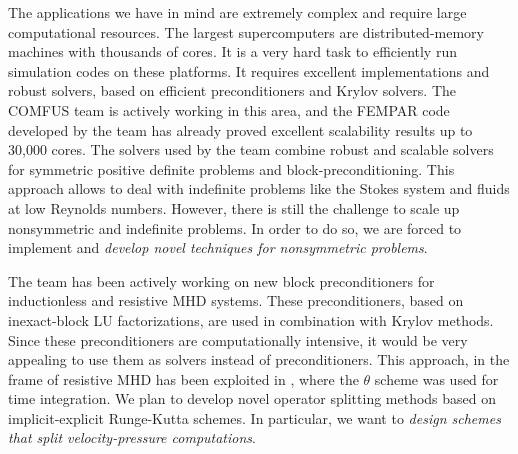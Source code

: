 The applications we have in mind are extremely complex and require large computational resources. The largest supercomputers are distributed-memory machines with thousands of cores. It is a very hard task to efficiently run simulation codes on these platforms. It requires excellent implementations and robust solvers, based on efficient preconditioners and Krylov solvers. The COMFUS team is actively working in this area, and the FEMPAR code developed by the team has already proved excellent scalability results up to 30,000 cores. The solvers used by the team combine robust and scalable solvers for symmetric positive definite problems and block-preconditioning. This approach allows to deal with indefinite problems like the Stokes system and fluids at low Reynolds numbers. However, there is still the challenge to scale up nonsymmetric and indefinite problems. In order to do so, we are forced to implement and \emph{develop novel techniques for nonsymmetric problems}.

The team has been actively working on new block preconditioners for inductionless and resistive MHD systems. These preconditioners, based on inexact-block LU factorizations, are used in combination with Krylov methods. Since these preconditioners are computationally intensive, it would be very appealing to use them as solvers instead of preconditioners. This approach, in the frame of resistive MHD has been exploited in \cite{badia_unconditionally_2012}, where the $\theta$ scheme was used for time integration. We plan to develop novel operator splitting methods based on implicit-explicit Runge-Kutta schemes. In particular, we want to \emph{design schemes that split velocity-pressure computations}.

